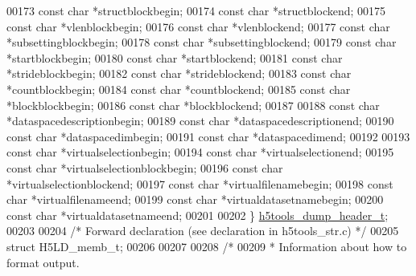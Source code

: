 \begin{DoxyCode}
{00173     \textcolor{keyword}{const} \textcolor{keywordtype}{char} *structblockbegin;
00174     \textcolor{keyword}{const} \textcolor{keywordtype}{char} *structblockend;
00175     \textcolor{keyword}{const} \textcolor{keywordtype}{char} *vlenblockbegin;
00176     \textcolor{keyword}{const} \textcolor{keywordtype}{char} *vlenblockend;
00177     \textcolor{keyword}{const} \textcolor{keywordtype}{char} *subsettingblockbegin;
00178     \textcolor{keyword}{const} \textcolor{keywordtype}{char} *subsettingblockend;
00179     \textcolor{keyword}{const} \textcolor{keywordtype}{char} *startblockbegin;
00180     \textcolor{keyword}{const} \textcolor{keywordtype}{char} *startblockend;
00181     \textcolor{keyword}{const} \textcolor{keywordtype}{char} *strideblockbegin;
00182     \textcolor{keyword}{const} \textcolor{keywordtype}{char} *strideblockend;
00183     \textcolor{keyword}{const} \textcolor{keywordtype}{char} *countblockbegin;
00184     \textcolor{keyword}{const} \textcolor{keywordtype}{char} *countblockend;
00185     \textcolor{keyword}{const} \textcolor{keywordtype}{char} *blockblockbegin;
00186     \textcolor{keyword}{const} \textcolor{keywordtype}{char} *blockblockend;
00187 
00188     \textcolor{keyword}{const} \textcolor{keywordtype}{char} *dataspacedescriptionbegin;
00189     \textcolor{keyword}{const} \textcolor{keywordtype}{char} *dataspacedescriptionend;
00190     \textcolor{keyword}{const} \textcolor{keywordtype}{char} *dataspacedimbegin;
00191     \textcolor{keyword}{const} \textcolor{keywordtype}{char} *dataspacedimend;
00192 
00193     \textcolor{keyword}{const} \textcolor{keywordtype}{char} *virtualselectionbegin;
00194     \textcolor{keyword}{const} \textcolor{keywordtype}{char} *virtualselectionend;
00195     \textcolor{keyword}{const} \textcolor{keywordtype}{char} *virtualselectionblockbegin;
00196     \textcolor{keyword}{const} \textcolor{keywordtype}{char} *virtualselectionblockend;
00197     \textcolor{keyword}{const} \textcolor{keywordtype}{char} *virtualfilenamebegin;
00198     \textcolor{keyword}{const} \textcolor{keywordtype}{char} *virtualfilenameend;
00199     \textcolor{keyword}{const} \textcolor{keywordtype}{char} *virtualdatasetnamebegin;
00200     \textcolor{keyword}{const} \textcolor{keywordtype}{char} *virtualdatasetnameend;
00201 
00202 \} \hyperlink{structh5tools__dump__header__t}{h5tools\_dump\_header\_t};
00203 
00204 \textcolor{comment}{/* Forward declaration (see declaration in h5tools\_str.c) */}
00205 \textcolor{keyword}{struct }H5LD\_memb\_t;
00206 
00207 
00208 \textcolor{comment}{/*}
00209 \textcolor{comment}{ * Information about how to format output.}
}
\end{DoxyCode}
